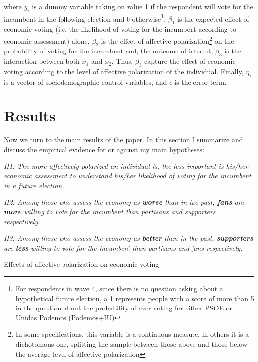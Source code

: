 \documentclass[a4paper, svgnames]{article}
\begin{document}
where $y_i$ is a dummy variable taking on value 1 if the respondent will vote for the incumbent in the following election and 0 otherwise\footnote{For respondents in wave 4, since there is no question asking about a hypothetical future election, a 1 represents people with a score of more than 5 in the question about the probability of ever voting for either PSOE or Unidas Podemos (Podemos+IU)}, $\beta_1$ is the expected effect of economic voting (i.e. the likelihood of voting for the incumbent according to economic assessment) alone, $\beta_2$ is the effect of affective polarization\footnote{In some specifications, this variable is a continuous measure, in others it is a dichotomous one, splitting the sample between those above and those below the average level of affective polarization} on the probability of voting for the incumbent and, the outcome of interest, $\beta_3$ is the interaction between both $x_1$ and $x_2$. Thus, $\beta_3$ capture the effect of economic voting according to the level of affective polarization of the individual. Finally, $\eta_i$ is a vector of sociodemographic control variables, and $\epsilon$ is the error term.


\section{Results}

Now we turn to the main results of the paper. In this section I summarize and discuss the empirical evidence for or against my main hypotheses:

\textit{H1: The more affectively polarized an individual is, the less important is his/her economic assessment to understand his/her likelihood of voting for the incumbent in a future election.}

\textit{H2: Among those who assess the economy as \textbf{worse} than in the past, \textbf{fans} are \textbf{more} willing to vote for the incumbent than partisans and supporters respectively.}

\textit{H3: Among those who assess the economy as \textbf{better} than in the past, \textbf{supporters} are \textbf{less} willing to vote for the incumbent than partisans and fans respectively. }

\begin{table}[H]
	\label{coefplot}
	\centering
	\caption{\label{tab:preferred_model} Effects of affective polarization on economic voting}
	

\end{table}
\end{document}
